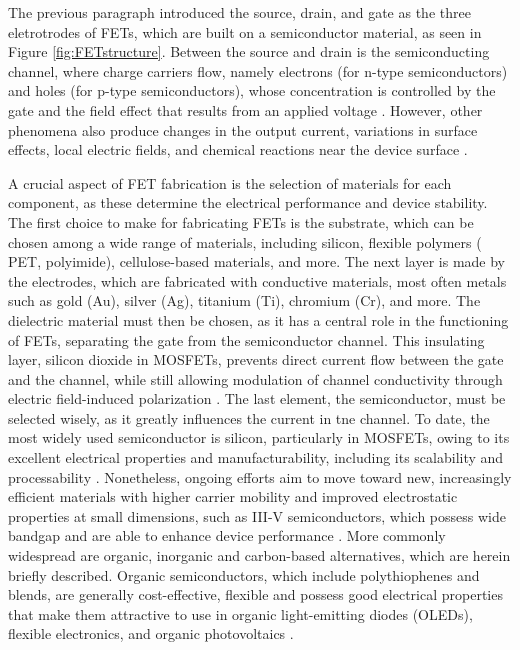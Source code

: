 The previous paragraph introduced the source, drain, and gate as the three eletrotrodes of FETs, which are built on a semiconductor material, as seen in Figure \ref{fig:FETstructure}. Between the source and drain is the semiconducting channel, where charge carriers flow, namely electrons (for n-type semiconductors) and holes (for p-type semiconductors), whose concentration is controlled by the gate and the field effect that results from an applied voltage \citep{liChemical2019, shkodraElectrolytegated2021}. However, other phenomena also produce changes in the output current, \eg{} variations in surface effects, local electric fields, and chemical reactions near the device surface \citep{sangProgress2016, shkodraElectrolytegated2021}.

A crucial aspect of FET fabrication is the selection of materials for each component, as these determine the electrical performance and device stability.
The first choice to make for fabricating FETs is the substrate, which can be chosen among a wide range of materials, including silicon, flexible polymers (\eg{} PET, polyimide), cellulose-based materials, and more.
The next layer is made by the electrodes, which are fabricated with conductive materials, most often metals such as gold (Au), silver (Ag), titanium (Ti), chromium (Cr), and more.
The dielectric material must then be chosen, as it has a central role in the functioning of FETs, separating the gate from the semiconductor channel. This insulating layer, \eg{} silicon dioxide in MOSFETs, prevents direct current flow between the gate and the channel, while still allowing modulation of channel conductivity through electric field-induced polarization \citep{ortizHighk2010, wangHighk2018}.
The last element, \ie{} the semiconductor, must be selected wisely, as it greatly influences the current in tne channel.
To date, the most widely used semiconductor is silicon, particularly in MOSFETs, owing to its excellent electrical properties and manufacturability, including its scalability and processability \citep{zahoorCarbon2023, heywangSilicon2004, guptaSemiconductor2016}. Nonetheless, ongoing efforts aim to move toward new, increasingly efficient materials with higher carrier mobility and improved electrostatic properties at small dimensions, such as III-V semiconductors, which possess wide bandgap and are able to enhance device performance \citep{chelliahCurrent2017, delalamoNanometrescale2011}. More commonly widespread are organic, inorganic and carbon-based alternatives, which are herein briefly described. Organic semiconductors, which include polythiophenes and blends, are generally cost-effective, flexible and possess good electrical properties that make them attractive to use in organic light-emitting diodes (OLEDs), flexible electronics, and organic photovoltaics \citep{facchettiSemiconductors2007, jacobsControlling2017, rootMechanical2017}.
